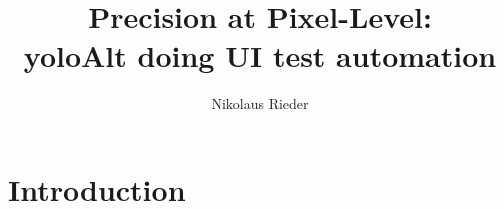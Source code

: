 \documentclass[Bachelor,BIC,english,fhCitStyle,IEEE]{BASE/twbook} %
\title{Precision at Pixel-Level:\\\acl{yoloAlt} doing UI test automation}
\author{Nikolaus Rieder}
\begin{document}
\maketitle
\chapter{Introduction}

\end{document}
